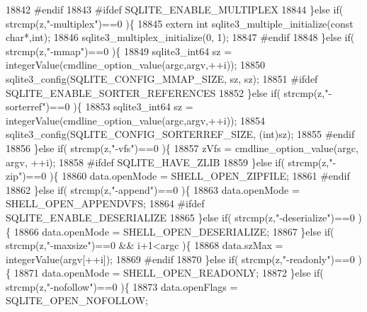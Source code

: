 \begin{DoxyCode}
{{18842 \textcolor{preprocessor}{#endif}
18843 \textcolor{preprocessor}{#ifdef SQLITE\_ENABLE\_MULTIPLEX}
18844     \}\textcolor{keywordflow}{else} \textcolor{keywordflow}{if}( strcmp(z,\textcolor{stringliteral}{"-multiplex"})==0 )\{
18845       \textcolor{keyword}{extern} \textcolor{keywordtype}{int} sqlite3\_multiple\_initialize(\textcolor{keyword}{const} \textcolor{keywordtype}{char}*,\textcolor{keywordtype}{int});
18846       sqlite3\_multiplex\_initialize(0, 1);
18847 \textcolor{preprocessor}{#endif}
18848     \}\textcolor{keywordflow}{else} \textcolor{keywordflow}{if}( strcmp(z,\textcolor{stringliteral}{"-mmap"})==0 )\{
18849       sqlite3_int64 sz = integerValue(cmdline_option_value(argc,argv,++i));
18850       sqlite3_config(SQLITE_CONFIG_MMAP_SIZE, sz, sz);
18851 \textcolor{preprocessor}{#ifdef SQLITE\_ENABLE\_SORTER\_REFERENCES}
18852     \}\textcolor{keywordflow}{else} \textcolor{keywordflow}{if}( strcmp(z,\textcolor{stringliteral}{"-sorterref"})==0 )\{
18853       sqlite3_int64 sz = integerValue(cmdline_option_value(argc,argv,++i));
18854       sqlite3_config(SQLITE_CONFIG_SORTERREF_SIZE, (\textcolor{keywordtype}{int})sz);
18855 \textcolor{preprocessor}{#endif}
18856     \}\textcolor{keywordflow}{else} \textcolor{keywordflow}{if}( strcmp(z,\textcolor{stringliteral}{"-vfs"})==0 )\{
18857       zVfs = cmdline_option_value(argc, argv, ++i);
18858 \textcolor{preprocessor}{#ifdef SQLITE\_HAVE\_ZLIB}
18859     \}\textcolor{keywordflow}{else} \textcolor{keywordflow}{if}( strcmp(z,\textcolor{stringliteral}{"-zip"})==0 )\{
18860       data.openMode = SHELL_OPEN_ZIPFILE;
18861 \textcolor{preprocessor}{#endif}
18862     \}\textcolor{keywordflow}{else} \textcolor{keywordflow}{if}( strcmp(z,\textcolor{stringliteral}{"-append"})==0 )\{
18863       data.openMode = SHELL_OPEN_APPENDVFS;
18864 \textcolor{preprocessor}{#ifdef SQLITE\_ENABLE\_DESERIALIZE}
18865     \}\textcolor{keywordflow}{else} \textcolor{keywordflow}{if}( strcmp(z,\textcolor{stringliteral}{"-deserialize"})==0 )\{
18866       data.openMode = SHELL_OPEN_DESERIALIZE;
18867     \}\textcolor{keywordflow}{else} \textcolor{keywordflow}{if}( strcmp(z,\textcolor{stringliteral}{"-maxsize"})==0 && i+1<argc )\{
18868       data.szMax = integerValue(argv[++i]);
18869 \textcolor{preprocessor}{#endif}
18870     \}\textcolor{keywordflow}{else} \textcolor{keywordflow}{if}( strcmp(z,\textcolor{stringliteral}{"-readonly"})==0 )\{
18871       data.openMode = SHELL_OPEN_READONLY;
18872     \}\textcolor{keywordflow}{else} \textcolor{keywordflow}{if}( strcmp(z,\textcolor{stringliteral}{"-nofollow"})==0 )\{
18873       data.openFlags = SQLITE_OPEN_NOFOLLOW;
}}
\end{DoxyCode}

